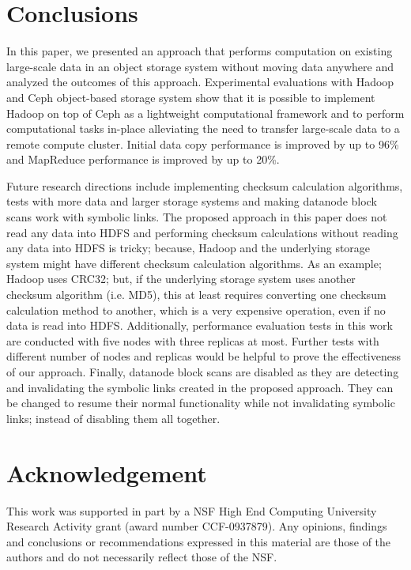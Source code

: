 \documentclass[preprint,12pt]{elsarticle}
\begin{document}
\section{Conclusions}
\label{conclusions}
In this paper, we presented an approach that performs computation
on existing large-scale data in an object storage system without moving
data anywhere and analyzed the outcomes of this approach. Experimental
evaluations with Hadoop and Ceph object-based storage system show that
it is possible to implement Hadoop on top of Ceph as a lightweight computational
framework and to perform computational tasks in-place alleviating the need to transfer
large-scale data to a remote compute cluster. Initial data copy
performance is improved by up to 96\% and MapReduce performance is
improved by up to 20\%.

Future research directions include implementing checksum calculation algorithms,
tests with more data and larger storage systems and making datanode block scans
work with symbolic links. The proposed approach in this paper
does not read any data into HDFS and performing checksum calculations without
reading any data into HDFS is tricky; because, Hadoop and the underlying storage
system might have different checksum calculation algorithms. As an example;
Hadoop uses CRC32; but, if the underlying storage system uses another checksum
algorithm (i.e. MD5), this at least requires converting one checksum calculation
method to another, which is a very expensive operation, even if no data is read
into HDFS. Additionally, performance evaluation tests in this work are conducted
with five nodes with three replicas at most. Further tests with different number
of nodes and replicas would be helpful to prove the effectiveness of our approach.
Finally, datanode block scans are disabled as they are detecting and invalidating
the symbolic links created in the proposed approach. They can be changed to resume their
normal functionality while not invalidating symbolic links; instead of disabling
them all together.
\label{sec-conclusion}

\section{Acknowledgement}
This work was supported in part by a NSF High End Computing University
Research Activity grant (award number CCF-0937879). Any opinions,
findings and conclusions or recommendations expressed in this material
are those of the authors and do not necessarily reflect those of the
NSF.
\end{document}
